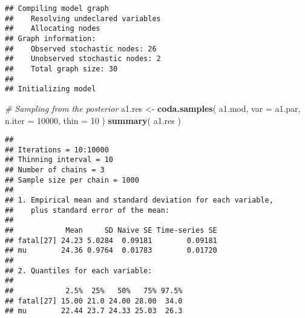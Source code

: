 \documentclass[]{article}
\newenvironment{Shaded}{\begin{snugshade}}{\end{snugshade}}
\newcommand{\KeywordTok}[1]{\textcolor[rgb]{0.13,0.29,0.53}{\textbf{#1}}}
\newcommand{\DataTypeTok}[1]{\textcolor[rgb]{0.13,0.29,0.53}{#1}}
\newcommand{\DecValTok}[1]{\textcolor[rgb]{0.00,0.00,0.81}{#1}}
\newcommand{\StringTok}[1]{\textcolor[rgb]{0.31,0.60,0.02}{#1}}
\newcommand{\CommentTok}[1]{\textcolor[rgb]{0.56,0.35,0.01}{\textit{#1}}}
\newcommand{\NormalTok}[1]{#1}
\begin{document}
\begin{verbatim}
## Compiling model graph
##    Resolving undeclared variables
##    Allocating nodes
## Graph information:
##    Observed stochastic nodes: 26
##    Unobserved stochastic nodes: 2
##    Total graph size: 30
## 
## Initializing model
\end{verbatim}

\begin{Shaded}
\begin{Highlighting}[]
\CommentTok{# Sampling from the posterior}
\NormalTok{a1.res <-}\StringTok{ }\KeywordTok{coda.samples}\NormalTok{( a1.mod,}
                      \DataTypeTok{var =}\NormalTok{ a1.par,}
                      \DataTypeTok{n.iter =} \DecValTok{10000}\NormalTok{,}
                      \DataTypeTok{thin =} \DecValTok{10}\NormalTok{ )}
\KeywordTok{summary}\NormalTok{( a1.res )}
\end{Highlighting}
\end{Shaded}

\begin{verbatim}
## 
## Iterations = 10:10000
## Thinning interval = 10 
## Number of chains = 3 
## Sample size per chain = 1000 
## 
## 1. Empirical mean and standard deviation for each variable,
##    plus standard error of the mean:
## 
##            Mean     SD Naive SE Time-series SE
## fatal[27] 24.23 5.0284  0.09181        0.09181
## mu        24.36 0.9764  0.01783        0.01720
## 
## 2. Quantiles for each variable:
## 
##            2.5%  25%   50%   75% 97.5%
## fatal[27] 15.00 21.0 24.00 28.00  34.0
## mu        22.44 23.7 24.33 25.03  26.3
\end{verbatim}
\end{document}
